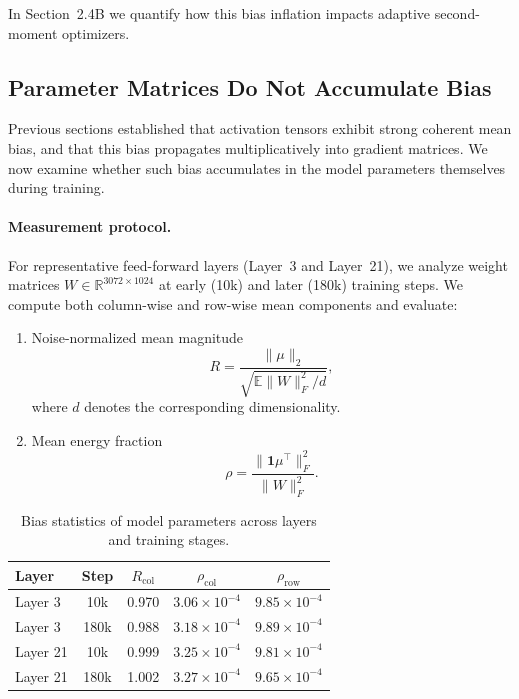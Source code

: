In Section~2.4B we quantify how this bias inflation impacts adaptive
second-moment optimizers.

\subsection{Parameter Matrices Do Not Accumulate Bias}
\label{subsec:parameter_bias}

Previous sections
established that activation tensors exhibit strong coherent mean bias,
and that this bias propagates multiplicatively into gradient matrices.
We now examine whether such bias accumulates in the model parameters
themselves during training.

\paragraph{Measurement protocol.}
For representative feed-forward layers (Layer~3 and Layer~21),
we analyze weight matrices
$W \in \mathbb{R}^{3072 \times 1024}$
at early (10k) and later (180k) training steps.
We compute both column-wise and row-wise mean components and evaluate:

\begin{enumerate}
\item Noise-normalized mean magnitude
\[
R = \frac{\|\mu\|_2}{\sqrt{\mathbb{E}\|W\|_F^2 / d}},
\]
where $d$ denotes the corresponding dimensionality.
\item Mean energy fraction
\[
\rho = \frac{\|\mathbf{1}\mu^\top\|_F^2}{\|W\|_F^2}.
\]
\end{enumerate}

\begin{table}[t]
\centering
\caption{Bias statistics of model parameters across layers and training stages.}
\label{tab:weight_bias}
\begin{tabular}{lcccc}
\toprule
Layer & Step & $R_{\text{col}}$ & $\rho_{\text{col}}$ & $\rho_{\text{row}}$ \\
\midrule
Layer 3  & 10k   & 0.970 & $3.06\times10^{-4}$ & $9.85\times10^{-4}$ \\
Layer 3  & 180k  & 0.988 & $3.18\times10^{-4}$ & $9.89\times10^{-4}$ \\
Layer 21 & 10k   & 0.999 & $3.25\times10^{-4}$ & $9.81\times10^{-4}$ \\
Layer 21 & 180k  & 1.002 & $3.27\times10^{-4}$ & $9.65\times10^{-4}$ \\
\bottomrule
\end{tabular}
\end{table}

